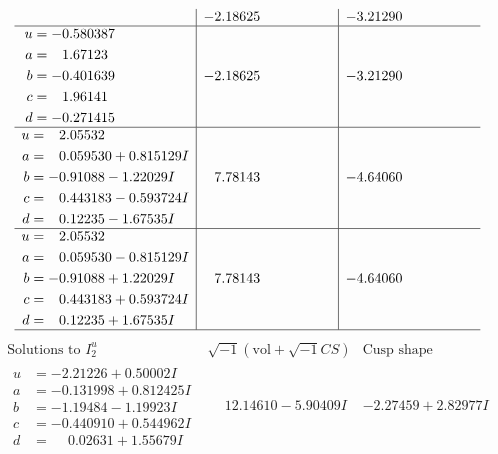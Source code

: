 \documentclass[1p]{elsarticle_modified}
\theoremstyle{definition}
\newcommand{\I}{\sqrt{-1}}
\begin{document}
$$\begin{array}{c|c|c}
 & -2.18625\phantom{ +0.000000I} & -3.21290\phantom{ +0.000000I} \\ \hline\begin{aligned}
u &= -0.580387\phantom{ +0.000000I} \\
a &= \phantom{-}1.67123\phantom{ +0.000000I} \\
b &= -0.401639\phantom{ +0.000000I} \\
c &= \phantom{-}1.96141\phantom{ +0.000000I} \\
d &= -0.271415\phantom{ +0.000000I}\end{aligned}
 & -2.18625\phantom{ +0.000000I} & -3.21290\phantom{ +0.000000I} \\ \hline\begin{aligned}
u &= \phantom{-}2.05532\phantom{ +0.000000I} \\
a &= \phantom{-}0.059530 + 0.815129 I \\
b &= -0.91088 - 1.22029 I \\
c &= \phantom{-}0.443183 - 0.593724 I \\
d &= \phantom{-}0.12235 - 1.67535 I\end{aligned}
 & \phantom{-}7.78143\phantom{ +0.000000I} & -4.64060\phantom{ +0.000000I} \\ \hline\begin{aligned}
u &= \phantom{-}2.05532\phantom{ +0.000000I} \\
a &= \phantom{-}0.059530 - 0.815129 I \\
b &= -0.91088 + 1.22029 I \\
c &= \phantom{-}0.443183 + 0.593724 I \\
d &= \phantom{-}0.12235 + 1.67535 I\end{aligned}
 & \phantom{-}7.78143\phantom{ +0.000000I} & -4.64060\phantom{ +0.000000I}\\
 \hline 
 \end{array}$$\newpage$$\begin{array}{c|c|c}  
\text{Solutions to }I^u_{2}& \I (\text{vol} + \sqrt{-1}CS) & \text{Cusp shape}\\
 \hline 
\begin{aligned}
u &= -2.21226 + 0.50002 I \\
a &= -0.131998 + 0.812425 I \\
b &= -1.19484 - 1.19923 I \\
c &= -0.440910 + 0.544962 I \\
d &= \phantom{-}0.02631 + 1.55679 I\end{aligned}
 & \phantom{-}12.14610 - 5.90409 I & -2.27459 + 2.82977 I \\ \hline\begin{aligned}

\end{aligned}
\end{array}$$
\end{document}
